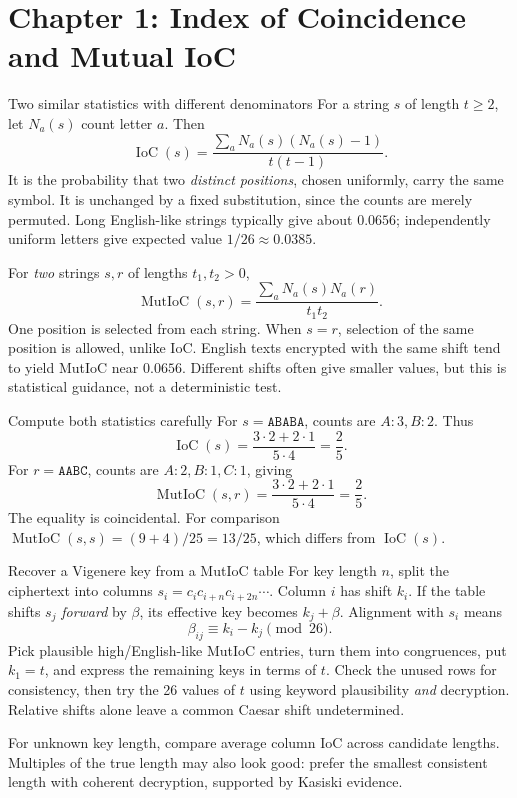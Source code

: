\documentclass[11pt,a4paper]{article}
\begin{document}
\section{Chapter 1: Index of Coincidence and Mutual IoC}
\begin{concept}{Two similar statistics with different denominators}
For a string \(s\) of length \(t\ge2\), let \(N_a(s)\) count letter \(a\). Then
\[\operatorname{IoC}(s)=\frac{\sum_a N_a(s)(N_a(s)-1)}{t(t-1)}.\]
It is the probability that two \emph{distinct positions}, chosen uniformly, carry the same symbol. It is unchanged by a fixed substitution, since the counts are merely permuted. Long English-like strings typically give about \(0.0656\); independently uniform letters give expected value \(1/26\approx0.0385\).

For \emph{two} strings \(s,r\) of lengths \(t_1,t_2>0\),
\[\operatorname{MutIoC}(s,r)=\frac{\sum_aN_a(s)N_a(r)}{t_1t_2}.\]
One position is selected from each string. When \(s=r\), selection of the same position is allowed, unlike IoC. English texts encrypted with the same shift tend to yield MutIoC near \(0.0656\). Different shifts often give smaller values, but this is statistical guidance, not a deterministic test.
\end{concept}
\begin{example}{Compute both statistics carefully}
For \(s=\texttt{ABABA}\), counts are \(A:3,B:2\). Thus
\[\operatorname{IoC}(s)=\frac{3\cdot2+2\cdot1}{5\cdot4}=\frac25.\]
For \(r=\texttt{AABC}\), counts are \(A:2,B:1,C:1\), giving
\[\operatorname{MutIoC}(s,r)=\frac{3\cdot2+2\cdot1}{5\cdot4}=\frac25.\]
The equality is coincidental. For comparison \(\operatorname{MutIoC}(s,s)=(9+4)/25=13/25\), which differs from \(\operatorname{IoC}(s)\).
\end{example}
\begin{method}{Recover a Vigenere key from a MutIoC table}
For key length \(n\), split the ciphertext into columns \(s_i=c_ic_{i+n}c_{i+2n}\cdots\). Column \(i\) has shift \(k_i\). If the table shifts \(s_j\) \emph{forward} by \(\beta\), its effective key becomes \(k_j+\beta\). Alignment with \(s_i\) means
\[\boxed{\beta_{ij}\equiv k_i-k_j\pmod{26}.}\]
Pick plausible high/English-like MutIoC entries, turn them into congruences, put \(k_1=t\), and express the remaining keys in terms of \(t\). Check the unused rows for consistency, then try the 26 values of \(t\) using keyword plausibility \emph{and} decryption. Relative shifts alone leave a common Caesar shift undetermined.

For unknown key length, compare average column IoC across candidate lengths. Multiples of the true length may also look good: prefer the smallest consistent length with coherent decryption, supported by Kasiski evidence.
\end{method}
\end{document}
